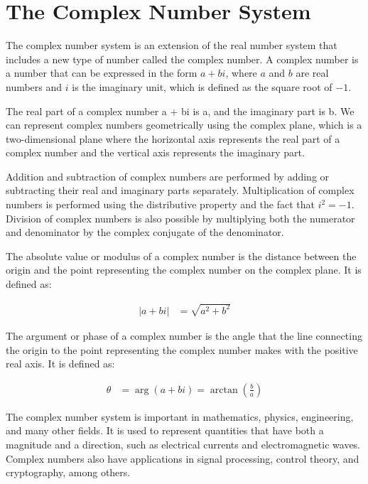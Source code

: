 \documentclass[12pt,openany]{book}
\theoremstyle{definition}
\begin{document}
	
	\chapter{The Complex Number System}
	
	The complex number system is an extension of the real number system that includes a new type of number called the complex number. A complex number is a number that can be expressed in the form $a + bi$, where $a$ and $b$ are real numbers and $i$ is the imaginary unit, which is defined as the square root of $-1$.
	
	The real part of a complex number a + bi is a, and the imaginary part is b. We can represent complex numbers geometrically using the complex plane, which is a two-dimensional plane where the horizontal axis represents the real part of a complex number and the vertical axis represents the imaginary part.
	
	Addition and subtraction of complex numbers are performed by adding or subtracting their real and imaginary parts separately. Multiplication of complex numbers is performed using the distributive property and the fact that $i^2 = -1$. Division of complex numbers is also possible by multiplying both the numerator and denominator by the complex conjugate of the denominator.
	
	The absolute value or modulus of a complex number is the distance between the origin and the point representing the complex number on the complex plane. It is defined as:
	
	\begin{align*}
	|a+bi| &= \sqrt{a^2 + b^2}
	\end{align*}
	
	The argument or phase of a complex number is the angle that the line connecting the origin to the point representing the complex number makes with the positive real axis. It is defined as:
	
	\begin{align*}
	\theta &= \operatorname{arg}(a+bi) = \operatorname{arctan}\left(\frac{b}{a}\right)
	\end{align*}
	
	The complex number system is important in mathematics, physics, engineering, and many other fields. It is used to represent quantities that have both a magnitude and a direction, such as electrical currents and electromagnetic waves. Complex numbers also have applications in signal processing, control theory, and cryptography, among others.
	
\end{document}
